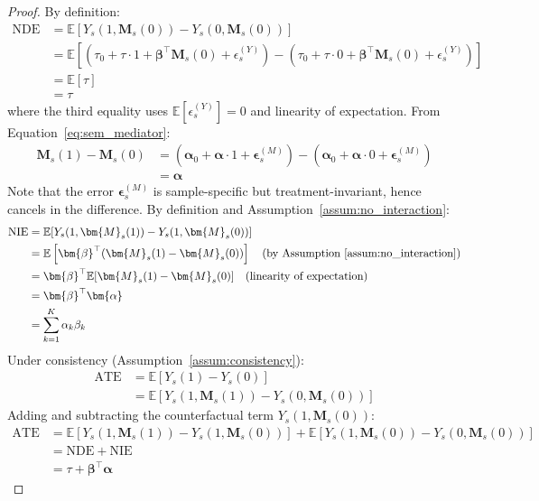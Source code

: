 \documentclass[
    reprint,
    amsmath, amssymb,
    aps,
    floatfix,
    nofootinbib
]{revtex4-1}
\begin{document}
\begin{proof} By definition:
\begin{align}
\text{NDE} &= \mathbb{E}[Y_s(1, \bm{M}_s(0)) - Y_s(0, \bm{M}_s(0))] \\
&= \mathbb{E}\left[\left(\tau_0 + \tau \cdot 1 + \bm{\beta}^\top \bm{M}_s(0) + \epsilon_s^{(Y)}\right) - \left(\tau_0 + \tau \cdot 0 + \bm{\beta}^\top \bm{M}_s(0) + \epsilon_s^{(Y)}\right)\right] \\
&= \mathbb{E}[\tau] \\
&= \tau
\end{align}
where the third equality uses $\mathbb{E}[\epsilon_s^{(Y)}] = 0$ and linearity of expectation. From Equation~\eqref{eq:sem_mediator}:
\begin{align}
\bm{M}_s(1) - \bm{M}_s(0) &= (\bm{\alpha}_0 + \bm{\alpha} \cdot 1 + \bm{\epsilon}_s^{(M)}) - (\bm{\alpha}_0 + \bm{\alpha} \cdot 0 + \bm{\epsilon}_s^{(M)}) \\
&= \bm{\alpha}
\end{align}
Note that the error $\bm{\epsilon}_s^{(M)}$ is sample-specific but treatment-invariant, hence cancels in the difference. By definition and Assumption~\ref{assum:no_interaction}:
\begin{align}
\text{NIE} &= \mathbb{E}[Y_s(1, \bm{M}_s(1)) - Y_s(1, \bm{M}_s(0))] \\
&= \mathbb{E}\left[\bm{\beta}^\top (\bm{M}_s(1) - \bm{M}_s(0))\right] \quad \text{(by Assumption~\ref{assum:no_interaction})} \\
&= \bm{\beta}^\top \mathbb{E}[\bm{M}_s(1) - \bm{M}_s(0)] \quad \text{(linearity of expectation)} \\
&= \bm{\beta}^\top \bm{\alpha} \quad \\
&= \sum_{k=1}^{K} \alpha_k \beta_k
\end{align}
Under consistency (Assumption~\ref{assum:consistency}):
\begin{align}
\text{ATE} &= \mathbb{E}[Y_s(1) - Y_s(0)] \\
&= \mathbb{E}[Y_s(1, \bm{M}_s(1)) - Y_s(0, \bm{M}_s(0))]
\end{align}
Adding and subtracting the counterfactual term $Y_s(1, \bm{M}_s(0))$:
\begin{align}
\text{ATE} &= \mathbb{E}[Y_s(1, \bm{M}_s(1)) - Y_s(1, \bm{M}_s(0))] + \mathbb{E}[Y_s(1, \bm{M}_s(0)) - Y_s(0, \bm{M}_s(0))] \\
&= \text{NDE} + \text{NIE}\\
&=  \tau + \bm{\beta}^\top\bm{\alpha} \quad 
\end{align}
\end{proof}
\end{document}
